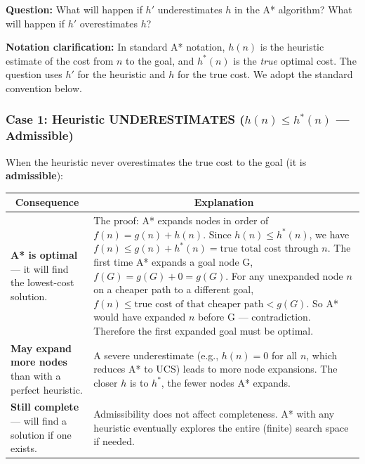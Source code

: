 \documentclass[12pt, a4paper]{article}
\newenvironment{solutionbox}{\begin{mdframed}[style=solutionframe]}{\end{mdframed}}
\begin{document}
\begin{solutionbox}
\textbf{Question:} What will happen if $h'$ underestimates $h$ in the A* algorithm? What will happen if $h'$ overestimates $h$?
\end{solutionbox}

\vspace{0.4em}

\noindent\textbf{Notation clarification:} In standard A* notation, $h(n)$ is the heuristic estimate of the cost from $n$ to the goal, and $h^*(n)$ is the \emph{true} optimal cost. The question uses $h'$ for the heuristic and $h$ for the true cost. We adopt the standard convention below.

\subsubsection*{Case 1: Heuristic UNDERESTIMATES ($h(n) \leq h^*(n)$ — Admissible)}

When the heuristic never overestimates the true cost to the goal (it is \textbf{admissible}):

\begin{center}
\renewcommand{\arraystretch}{1.4}
\begin{tabular}{p{7cm}|p{9cm}}
\toprule
\multicolumn{1}{c|}{\textbf{Consequence}} & \multicolumn{1}{c}{\textbf{Explanation}} \\
\midrule
\textbf{A* is optimal} — it will find the lowest-cost solution. &
The proof: A* expands nodes in order of $f(n)=g(n)+h(n)$. Since $h(n) \leq h^*(n)$, we have $f(n) \leq g(n)+h^*(n) = \text{true total cost through } n$. The first time A* expands a goal node G, $f(G) = g(G) + 0 = g(G)$. For any unexpanded node $n$ on a cheaper path to a different goal, $f(n) \leq \text{true cost of that cheaper path} < g(G)$. So A* would have expanded $n$ before G — contradiction. Therefore the first expanded goal must be optimal. \\
\midrule
\textbf{May expand more nodes} than with a perfect heuristic. &
A severe underestimate (e.g., $h(n)=0$ for all $n$, which reduces A* to UCS) leads to more node expansions. The closer $h$ is to $h^*$, the fewer nodes A* expands. \\
\midrule
\textbf{Still complete} — will find a solution if one exists. &
Admissibility does not affect completeness. A* with any heuristic eventually explores the entire (finite) search space if needed. \\
\bottomrule
\end{tabular}
\end{center}
\end{document}
